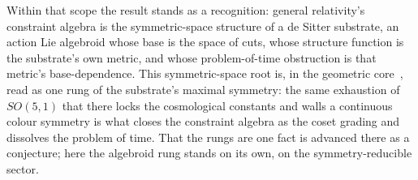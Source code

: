 \documentclass[11pt,a4paper]{article}
\theoremstyle{plain}
\theoremstyle{definition}
\theoremstyle{remark}
\begin{document}
Within that scope the result stands as a recognition: general relativity's constraint algebra is the symmetric-space structure of a de Sitter substrate, an action Lie algebroid whose base is the space of cuts, whose structure function is the substrate's own metric, and whose problem-of-time obstruction is that metric's base-dependence. This symmetric-space root is, in the geometric core~\cite{JanzenGeometricCore}, read as one rung of the substrate's maximal symmetry: the same exhaustion of $SO(5,1)$ that there locks the cosmological constants and walls a continuous colour symmetry is what closes the constraint algebra as the coset grading and dissolves the problem of time. That the rungs are one fact is advanced there as a conjecture; here the algebroid rung stands on its own, on the symmetry-reducible sector.
\end{document}
